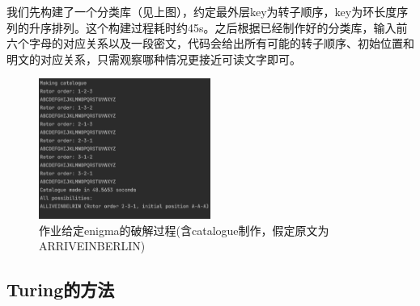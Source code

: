 \documentclass[a4paper,12pt]{article}
\begin{document}
	我们先构建了一个分类库（见上图），约定最外层key为转子顺序，key为环长度序列的升序排列。这个构建过程耗时约45s。之后根据已经制作好的分类库，输入前六个字母的对应关系以及一段密文，代码会给出所有可能的转子顺序、初始位置和明文的对应关系，只需观察哪种情况更接近可读文字即可。
	
	\begin{figure}[h]
		\centering
		\includegraphics[width=0.5\textwidth]{rej}
		\caption{作业给定enigma的破解过程(含catalogue制作，假定原文为ARRIVEINBERLIN)}
	\end{figure}
	
	
	\subsection{Turing的方法}
	
\end{document}

